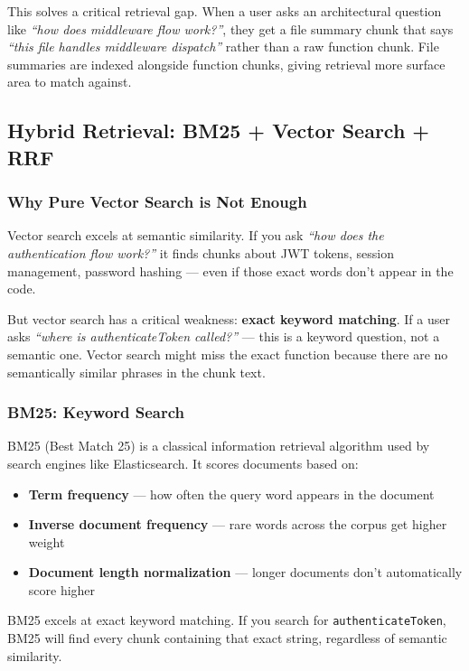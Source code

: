 \documentclass[a4paper,11pt]{article}
\begin{document}
This solves a critical retrieval gap. When a user asks an architectural question like \textit{``how does middleware flow work?''}, they get a file summary chunk that says \textit{``this file handles middleware dispatch''} rather than a raw function chunk. File summaries are indexed alongside function chunks, giving retrieval more surface area to match against.

\subsection{Hybrid Retrieval: BM25 + Vector Search + RRF}

\subsubsection{Why Pure Vector Search is Not Enough}
Vector search excels at semantic similarity. If you ask \textit{``how does the authentication flow work?''} it finds chunks about JWT tokens, session management, password hashing --- even if those exact words don't appear in the code.

But vector search has a critical weakness: \textbf{exact keyword matching}. If a user asks \textit{``where is authenticateToken called?''} --- this is a keyword question, not a semantic one. Vector search might miss the exact function because there are no semantically similar phrases in the chunk text.

\subsubsection{BM25: Keyword Search}
BM25 (Best Match 25) is a classical information retrieval algorithm used by search engines like Elasticsearch. It scores documents based on:
\begin{itemize}
    \item \textbf{Term frequency} --- how often the query word appears in the document
    \item \textbf{Inverse document frequency} --- rare words across the corpus get higher weight
    \item \textbf{Document length normalization} --- longer documents don't automatically score higher
\end{itemize}

BM25 excels at exact keyword matching. If you search for \texttt{authenticateToken}, BM25 will find every chunk containing that exact string, regardless of semantic similarity.
\end{document}

